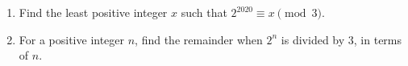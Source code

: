 \begin{enumerate}
\item[(a)] Find the least positive integer $x$ such that $2^{2020}\equiv x\pmod3$.
\item[(b)] For a positive integer $n$, find the remainder when $2^n$ is divided by $3$, in terms of $n$.
\end{enumerate}
